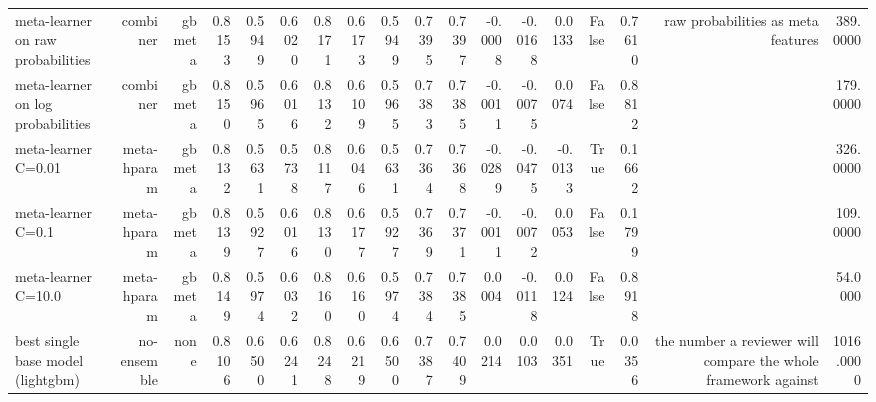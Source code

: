 \begin{table}[t]
{\begin{tabular}{lrrrrrrrrrrrrrrrrr}
meta-learner on raw probabilities & combiner & gbmeta & 0.8153 & 0.5949 & 0.6020 & 0.8171 & 0.6173 & 0.5949 & 0.7395 & 0.7397 & -0.0008 & -0.0168 & 0.0133 & False & 0.7610 & raw probabilities as meta features & 389.0000 \\
meta-learner on log probabilities & combiner & gbmeta & 0.8150 & 0.5965 & 0.6016 & 0.8132 & 0.6109 & 0.5965 & 0.7383 & 0.7385 & -0.0011 & -0.0075 & 0.0074 & False & 0.8812 &  & 179.0000 \\
meta-learner C=0.01 & meta-hparam & gbmeta & 0.8132 & 0.5631 & 0.5738 & 0.8117 & 0.6046 & 0.5631 & 0.7364 & 0.7368 & -0.0289 & -0.0475 & -0.0133 & True & 0.1662 &  & 326.0000 \\
meta-learner C=0.1 & meta-hparam & gbmeta & 0.8139 & 0.5927 & 0.6016 & 0.8130 & 0.6177 & 0.5927 & 0.7369 & 0.7371 & -0.0011 & -0.0072 & 0.0053 & False & 0.1799 &  & 109.0000 \\
meta-learner C=10.0 & meta-hparam & gbmeta & 0.8149 & 0.5974 & 0.6032 & 0.8160 & 0.6160 & 0.5974 & 0.7384 & 0.7385 & 0.0004 & -0.0118 & 0.0124 & False & 0.8918 &  & 54.0000 \\
best single base model (lightgbm) & no-ensemble & none & 0.8106 & 0.6500 & 0.6241 & 0.8248 & 0.6219 & 0.6500 & 0.7387 & 0.7409 & 0.0214 & 0.0103 & 0.0351 & True & 0.0356 & the number a reviewer will compare the whole framework against & 1016.0000 \\
\bottomrule
\end{tabular}
}
\end{table}
